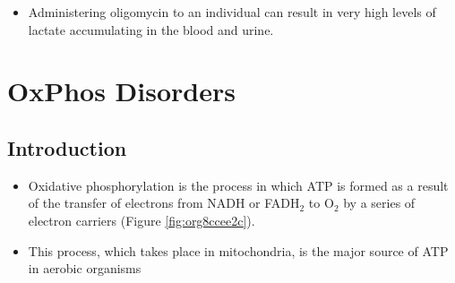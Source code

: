 \documentclass{scrartcl}
\begin{document}
\begin{enumerate}
\begin{itemize}
\item Administering oligomycin to an individual can result in very high
levels of lactate accumulating in the blood and urine.
\end{itemize}
\end{enumerate}
\section{OxPhos Disorders}
\label{sec:orgd596e7f}
\subsection{Introduction}
\label{sec:org2976db9}
\begin{itemize}
\item Oxidative phosphorylation is the process in which ATP is formed as a
result of the transfer of electrons from NADH or FADH\(_{\text{2}}\) to O\(_{\text{2}}\) by a
series of electron carriers (Figure \ref{fig:org8ccee2c}).
\item This process, which takes place in mitochondria, is the major source
of ATP in aerobic organisms
\end{itemize}
\end{document}
